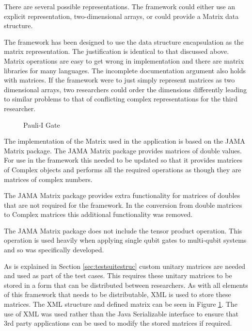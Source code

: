 There are several possible representations.
The framework could either use an explicit representation, two-dimensional arrays, or could provide a Matrix data structure.

The framework has been designed to use the data structure encapsulation as the matrix representation.
The justification is identical to that discussed above.
Matrix operations are easy to get wrong in implementation and there are matrix libraries for many languages.
The incomplete documentation argument also holds with matrices.
If the framework were to just simply represent matrices as two dimensional arrays, two researchers could order the dimensions differently leading to similar problems to that of conflicting complex representations for the third researcher.

\lstset{language = XML,
basicstyle=\footnotesize,
breakatwhitespace=false,
numbers=none,
breaklines=true}
\begin{figure}
\begin{center}
\hspace{20pt}
\end{center}
\caption{Pauli-I Gate}
\label{code:pauliixmldef}
\end{figure}

The implementation of the Matrix used in the application is based on the JAMA Matrix package\cite{javamatrix}.
The JAMA Matrix package provides matrices of double values.
For use in the framework this needed to be updated so that it provides matrices of Complex objects and performs all the required operations as though they are matrices of complex numbers.

The JAMA Matrix package provides extra functionality for matrices of doubles that are not required for the framework.
In the conversion from double matrices to Complex matrices this additional functionality was removed.

The JAMA Matrix package does not include the tensor product operation.
This operation is used heavily when applying single qubit gates to multi-qubit systems and so was specifically developed.

As is explained in Section \ref{sec:testsuitestruc} custom unitary matrices are needed and used as part of the test cases.
This requires these unitary matrices to be stored in a form that can be distributed between researchers.
As with all elements of this framework that needs to be distributable, XML is used to store these matrices.
The XML structure and defined matrix can be seen in Figure \ref{code:pauliixmldef}.
The use of XML was used rather than the Java Serializable interface to ensure that 3rd party applications can be used to modify the stored matrices if required.

